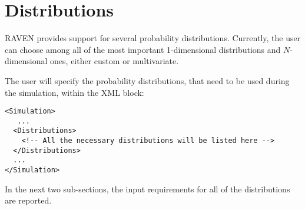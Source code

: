 \section{Distributions \\ \vspace{2 mm}}
\label{sec:distributions}
\newcommand{\distname}[1]{\textbf{#1}}
\newcommand{\distattrib}[1]{\textit{#1}}

\newcommand{\nameDescription}{\xmlAttr{name}, 
  \xmlDesc{required string attribute}, user-defined name of this distribution.
  \nb As with other objects, this identifier can be used to reference this
  specific entity from other input blocks in the XML.}
\newcommand{\specBlock}[2]{The specifications of this distribution must be
defined within #1 \xmlNode{#2} XML block.}
\newcommand{\attrIntro}{This XML node accepts one attribute:}
\newcommand{\attrsIntro}{This XML node accepts the following attributes:}
\newcommand{\subnodeIntro}{This distribution can be initialized with the
following child:}
\newcommand{\subnodesIntro}{This distribution can be initialized with the 
following children:}


RAVEN provides support for several probability distributions.
%
Currently, the user can choose among all of the most important 1-dimensional
distributions and $N$-dimensional ones, either custom or multivariate.  

The user will specify the probability distributions, that need to be used during
the simulation, within the  XML block:
\begin{lstlisting}[style=XML]
<Simulation>
   ...
  <Distributions>
    <!-- All the necessary distributions will be listed here -->
  </Distributions>
  ...
</Simulation>
\end{lstlisting}

In the next two sub-sections, the input requirements for all of the
distributions are reported.

